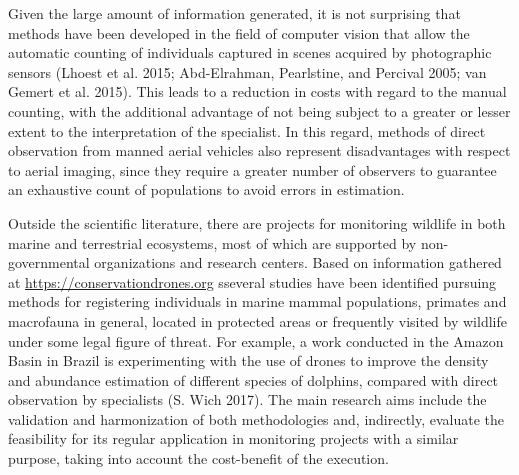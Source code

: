 \documentclass[]{interact}
\theoremstyle{plain}%
\theoremstyle{definition}
\theoremstyle{remark}
\begin{document}
Given the large amount of information generated, it is not surprising
that methods have been developed in the field of computer vision that
allow the automatic counting of individuals captured in scenes acquired
by photographic sensors (Lhoest et al. 2015; Abd-Elrahman, Pearlstine,
and Percival 2005; van Gemert et al. 2015). This leads to a reduction in
costs with regard to the manual counting, with the additional advantage
of not being subject to a greater or lesser extent to the interpretation
of the specialist. In this regard, methods of direct observation from
manned aerial vehicles also represent disadvantages with respect to
aerial imaging, since they require a greater number of observers to
guarantee an exhaustive count of populations to avoid errors in
estimation.

Outside the scientific literature, there are projects for monitoring
wildlife in both marine and terrestrial ecosystems, most of which are
supported by non-governmental organizations and research centers. Based
on information gathered at \url{https://conservationdrones.org} sseveral
studies have been identified pursuing methods for registering
individuals in marine mammal populations, primates and macrofauna in
general, located in protected areas or frequently visited by wildlife
under some legal figure of threat. For example, a work conducted in the
Amazon Basin in Brazil is experimenting with the use of drones to
improve the density and abundance estimation of different species of
dolphins, compared with direct observation by specialists (S. Wich
2017). The main research aims include the validation and harmonization
of both methodologies and, indirectly, evaluate the feasibility for its
regular application in monitoring projects with a similar purpose,
taking into account the cost-benefit of the execution.
\end{document}
